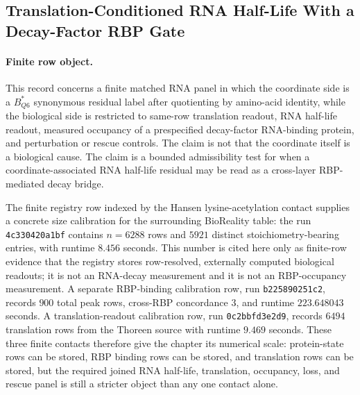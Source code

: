 \subsection{Translation-Conditioned RNA Half-Life With a Decay-Factor RBP Gate}\label{sec:bioreality-q6-rna-half-life-rbp-bridge}

\paragraph{Finite row object.}
This record concerns a finite matched RNA panel in which the coordinate side is a $B^{*}_{Q6}$ synonymous residual label after quotienting by amino-acid identity, while the biological side is restricted to same-row translation readout, RNA half-life readout, measured occupancy of a prespecified decay-factor RNA-binding protein, and perturbation or rescue controls.  The claim is not that the coordinate itself is a biological cause.  The claim is a bounded admissibility test for when a coordinate-associated RNA half-life residual may be read as a cross-layer RBP-mediated decay bridge.

The finite registry row indexed by the Hansen lysine-acetylation contact supplies a concrete size calibration for the surrounding BioReality table: the run \texttt{4c330420a1bf} contains $n=6288$ rows and $5921$ distinct stoichiometry-bearing entries, with runtime $8.456$ seconds.  This number is cited here only as finite-row evidence that the registry stores row-resolved, externally computed biological readouts; it is not an RNA-decay measurement and it is not an RBP-occupancy measurement.  A separate RBP-binding calibration row, run \texttt{b225890251c2}, records $900$ total peak rows, cross-RBP concordance $3$, and runtime $223.648043$ seconds.  A translation-readout calibration row, run \texttt{0c2bbfd3e2d9}, records $6494$ translation rows from the Thoreen source with runtime $9.469$ seconds.  These three finite contacts therefore give the chapter its numerical scale: protein-state rows can be stored, RBP binding rows can be stored, and translation rows can be stored, but the required joined RNA half-life, translation, occupancy, loss, and rescue panel is still a stricter object than any one contact alone.

